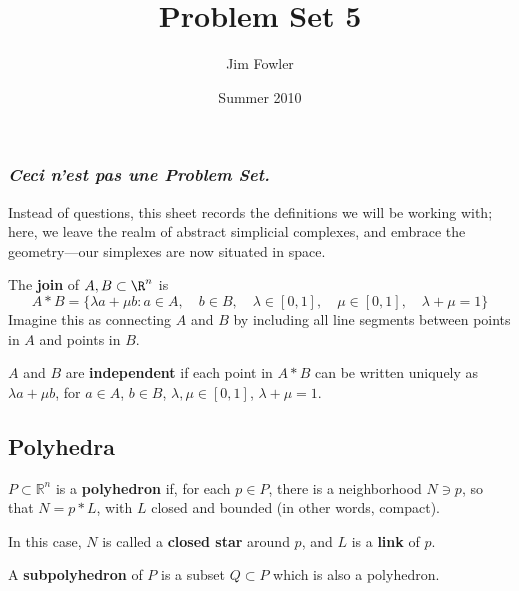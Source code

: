 \documentclass[12pt]{pset}
\title{Problem Set 5}
\author{Jim Fowler}
\date{Summer 2010}
\newcommand{\join}{\ast}
\begin{document}
\maketitle

\subsubsection*{\textit{Ceci n'est pas une Problem Set.}} Instead of
questions, this sheet records the definitions we will be working with;
here, we leave the realm of abstract simplicial complexes, and embrace
the geometry---our simplexes are now situated in space.

\baselineskip
\parindent 0pt

\begin{definition*}
The \textbf{join} of $A, B \subset \R^n$ is $$
A \join B = \{ \lambda a + \mu b : a
\in A, \hspace{1em}b \in B, \hspace{1em}\lambda \in [0,1], \hspace{1em}\mu \in [0,1], \hspace{1em}\lambda + \mu = 1 \}
$$
Imagine this as connecting $A$ and $B$ by including all line segments
between points in $A$ and points in $B$.

$A$ and $B$ are \textbf{independent} if each point in $A \join B$ can
be written uniquely as $\lambda a + \mu b$, for $a \in A$, $b \in B$,
$\lambda, \mu \in [0,1]$, $\lambda + \mu = 1$.
\end{definition*}


\subsection*{Polyhedra}

\begin{definition*}
  $P \subset \mathbb{R}^n$ is a \textbf{polyhedron} if, for each $p
  \in P$, there is a neighborhood $N \ni p$, so that $N = p \join L$,
  with $L$ closed and bounded (in other words, compact).
  
  In this case, $N$ is called a \textbf{closed star} around $p$, and
  $L$ is a \textbf{link} of $p$.

  A \textbf{subpolyhedron} of $P$ is a subset $Q \subset P$ which is
  also a polyhedron.
\end{definition*}
\end{document}
